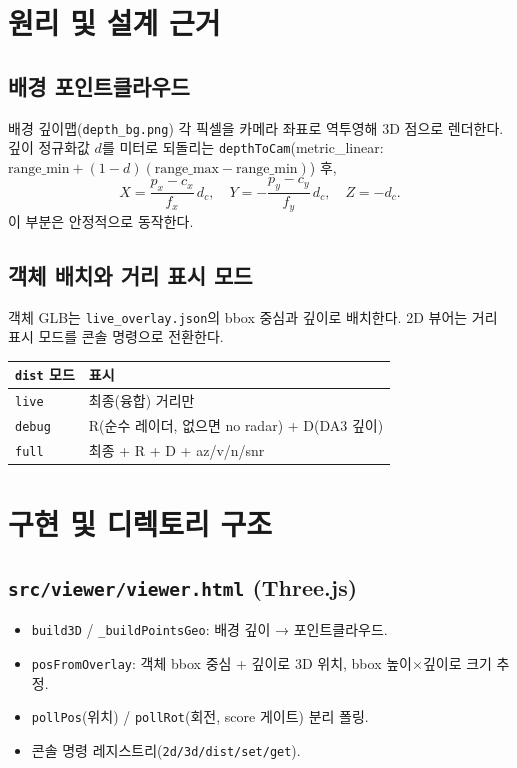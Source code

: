 \begin{statustodo}[ — 배경 렌더는 동작, 객체 배치 정합 진행 중]\end{statustodo}

\chapter{원리 및 설계 근거}

\section{배경 포인트클라우드}
배경 깊이맵(\texttt{depth\_bg.png}) 각 픽셀을 카메라 좌표로 역투영해 3D 점으로
렌더한다. 깊이 정규화값 $d$를 미터로 되돌리는 \texttt{depthToCam}(metric\_linear:
$\text{range\_min} + (1-d)(\text{range\_max}-\text{range\_min})$) 후,
\[
  X = \frac{p_x-c_x}{f_x}\,d_c,\quad
  Y = -\frac{p_y-c_y}{f_y}\,d_c,\quad Z = -d_c.
\]
이 부분은 안정적으로 동작한다.

\section{객체 배치와 거리 표시 모드}
객체 GLB는 \texttt{live\_overlay.json}의 bbox 중심과 깊이로 배치한다. 2D 뷰어는
거리 표시 모드를 콘솔 명령으로 전환한다.
\begin{center}
\begin{tabular}{@{}lp{8cm}@{}}
\toprule
\texttt{dist} 모드 & 표시 \\
\midrule
\texttt{live}  & 최종(융합) 거리만 \\
\texttt{debug} & R(순수 레이더, 없으면 no radar) + D(DA3 깊이) \\
\texttt{full}  & 최종 + R + D + az/v/n/snr \\
\bottomrule
\end{tabular}
\end{center}

\chapter{구현 및 디렉토리 구조}

\section{\texttt{src/viewer/viewer.html} (Three.js)}
\begin{itemize}
  \item \texttt{build3D} / \texttt{\_buildPointsGeo}: 배경 깊이 → 포인트클라우드.
  \item \texttt{posFromOverlay}: 객체 bbox 중심 + 깊이로 3D 위치, bbox 높이$\times$깊이로
        크기 추정.
  \item \texttt{pollPos}(위치) / \texttt{pollRot}(회전, score 게이트) 분리 폴링.
  \item 콘솔 명령 레지스트리(\texttt{2d/3d/dist/set/get}).
\end{itemize}


